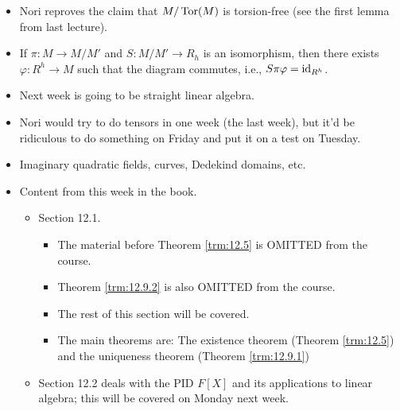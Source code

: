 \documentclass[../notes.tex]{subfiles}
\begin{document}
\begin{itemize}
\begin{enumerate}[label={(\roman*)}]
\begin{proof}
            Since $M$ is finitely generated, part (i) implies that $\Tor(M)\oplus R^h$ is finitely generated. Now consider the projection $\pi:\Tor(M)\oplus R^h\to\Tor(M)$. Since it is a surjection, the (finite number of) images of the generators of $\Tor(M)\oplus R^h$ generate $\Tor(M)$.
        \end{proof}
    \end{enumerate}
    \item Nori reproves the claim that $M/\operatorname{Tor}(M)$ is torsion-free (see the first lemma from last lecture).
    \item If $\pi:M\to M/M'$ and $S:M/M'\to R_h$ is an isomorphism, then there exists $\varphi:R^h\to M$ such that the diagram commutes, i.e., $S\pi\varphi=\operatorname{id}_{R^h}$.
    \item Next week is going to be straight linear algebra.
    \item Nori would try to do tensors in one week (the last week), but it'd be ridiculous to do something on Friday and put it on a test on Tuesday.
    \item Imaginary quadratic fields, curves, Dedekind domains, etc.
    \item Content from this week in the book.
    \begin{itemize}
        \item Section 12.1.
        \begin{itemize}
            \item The material before Theorem \ref{trm:12.5} is OMITTED from the course.
            \item Theorem \ref{trm:12.9.2} is also OMITTED from the course.
            \item The rest of this section will be covered.
            \item The main theorems are: The existence theorem (Theorem \ref{trm:12.5}) and the uniqueness theorem (Theorem \ref{trm:12.9.1})
        \end{itemize}
        \item Section 12.2 deals with the PID $F[X]$ and its applications to linear algebra; this will be covered on Monday next week.
    \end{itemize}
\end{itemize}
\end{document}
